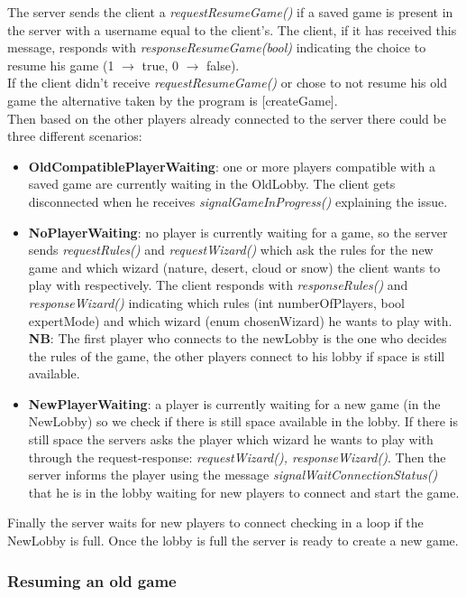 \documentclass[12pt]{article}
\begin{document}
				The server sends the client a \emph{requestResumeGame()} if a saved game is present in the server with a username equal to the client's. The client, if it has received this message, responds with \emph{responseResumeGame(bool)} indicating the choice to resume his game (1 $\rightarrow$ true, 0 $\rightarrow$ false). \\
				If the client didn't receive \emph{requestResumeGame()} or chose to not resume his old game the alternative taken by the program is [createGame]. \\
				Then based on the other players already connected to the server there could be three different scenarios:
				\begin{itemize}
					\item  \textbf{OldCompatiblePlayerWaiting}: one or more players compatible with a saved game are currently waiting in the OldLobby. The client gets disconnected when he receives \emph{signalGameInProgress()} explaining the issue.
					\item  \textbf{NoPlayerWaiting}: no player is currently waiting for a game, so the server sends \emph{requestRules()} and \emph{requestWizard()} which ask the rules for the new game and which wizard (nature, desert, cloud or snow) the client wants to play with respectively. The client responds with \emph{responseRules()} and \emph{responseWizard()} indicating which rules (int numberOfPlayers, bool expertMode) and which wizard (enum chosenWizard) he wants to play with. \\
					\textbf{NB}: The first player who connects to the newLobby is the one who decides the rules of the game, the other players connect to his lobby if space is still available.
					\item  \textbf{NewPlayerWaiting}: a player is currently waiting for a new game (in the NewLobby) so we check if there is still space available in the lobby. If there is still space the servers asks the player which wizard he wants to play with through the request-response: \emph{requestWizard(), responseWizard()}. Then the server informs the player using the message \emph{signalWaitConnectionStatus()} that he is in the lobby waiting for new players to connect and start the game.
				\end{itemize}
				Finally the server waits for new players to connect checking in a loop if the NewLobby is full. Once the lobby is full the server is ready to create a new game.
								
			\subsubsection{Resuming an old game}
			
\end{document}
